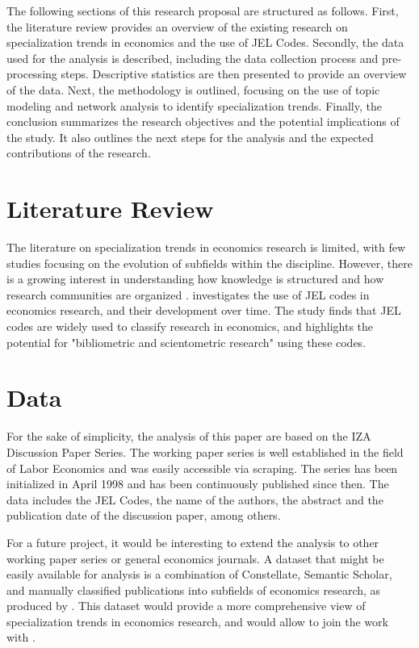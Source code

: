 \documentclass[11pt, a4paper, leqno]{article}
\begin{document}
The following sections of this research proposal are structured as follows.
First, the literature review provides an overview of the existing research on specialization trends in economics and the use of JEL Codes.
Secondly, the data used for the analysis is described, including the data collection process and pre-processing steps.
Descriptive statistics are then presented to provide an overview of the data.
Next, the methodology is outlined, focusing on the use of topic modeling and network analysis to identify specialization trends.
Finally, the conclusion summarizes the research objectives and the potential implications of the study.
It also outlines the next steps for the analysis and the expected contributions of the research.

\section{Literature Review}
The literature on specialization trends in economics research is limited, with few studies focusing on the evolution of subfields within the discipline.
However, there is a growing interest in understanding how knowledge is structured and how research communities are organized \cite{heikkila2022a}.
investigates the use of JEL codes in economics research, and their development over time.
The study finds that JEL codes are widely used to classify research in economics, and highlights the potential for "bibliometric and scientometric research" using these codes.

\section{Data}
For the sake of simplicity, the analysis of this paper are based on the IZA Discussion Paper Series.
The working paper series is well established in the field of Labor Economics and was easily accessible via scraping.
The series has been initialized in April 1998 and has been continuously published since then.
The data includes the JEL Codes, the name of the authors, the abstract and the publication date of the discussion paper, among others.

For a future project, it would be interesting to extend the analysis to other working paper series or general economics journals.
A dataset that might be easily available for analysis is a combination of Constellate, Semantic Scholar, and manually classified publications into subfields of economics research, as produced by \cite{galiani2023a}.
This dataset would provide a more comprehensive view of specialization trends in economics research, and would allow to join the work with .
\end{document}
